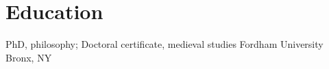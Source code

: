 \section{Education}
{PhD, philosophy; Doctoral certificate, medieval studies}
{Fordham University}
{Bronx, NY}{}{}  %
